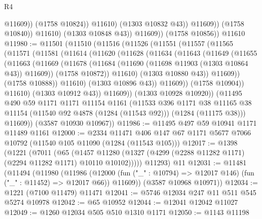 \begin{lexlean}{R4}
\begin{coremodule}
                              @11609))
                          (@1758 @10824))
                        @11610)
                      (@1303 @10832 @43))
                    @11609))
                (@1758 @10840))
              @11610)
            (@1303 @10848 @43))
          @11609))
      (@1758 @10856))
    @11610
@11980 := @11501
    (@11510
      (@11516
        (@11526
          (@11551
            (@11557
              (@11565
                (@11571
                  (@11581
                    (@11614
                      (@11620
                        (@11628
                          (@11634
                            (@11643
                              (@11649
                                (@11655
                                  (@11663
                                    (@11669
                                      (@11678
                                        (@11684 (@11690 (@11698 @11903 (@1303 @10864 @43)) @11609))
                                        (@1758 @10872))
                                      @11610)
                                    (@1303 @10880 @43))
                                  @11609))
                              (@1758 @10888))
                            @11610)
                          (@1303 @10896 @43))
                        @11609))
                    (@1758 @10904))
                  @11610)
                (@1303 @10912 @43))
              @11609))
          (@1303 @10928 @10920))
        (@11495
          @490
          @59
          @1171
          @1171
          @11154
          @1161
          (@11533
            @396
            @1171
            @38
            @11165
            @38
            @11154
            (@11540 @92 @4878 (@1284 (@11543 @92)))
            (@1284 (@11175 @38)))
          @11609))
      (@3587 @10930 @10967))
@11986 := @11495 @497 @59 @10941 @1171 @11489 @1161
@12000 := @2334
    @11471
    @406
    @147
    @67
    @1171
    @5677
    @7066
    @10792
    (@11540 @105 @11090 (@1284 (@11543 @105)))
@12017 := @1398
    (@1221
      (@7011
        (@65
          (@1457 @11280 (@1327 (@4299 (@2288 @11282 @1171) (@2294 @11282 @1171) @10110 @10102)))))
      @11293)
    @11
@12031 := @11481
    (@11494
      (@11980
        (@11986
          (@12000 (fun ("_" : @10794) => @12017 @146) (fun ("_" : @11452) => @12017 @66))
          @11609))
      (@3587 @10968 @10971))
@12034 := @1221 (@7100 @11479) @11471
@12041 := @5746 @12034 @247 @11 @511 @545 @5274 @10978
@12042 := @65 @10952
@12044 := @12041 @12042 @11027
@12049 := @1260 @12034 @505 @510 @1310 @1171
@12050 := @1143 @11198

\end{coremodule}
\end{lexlean}
